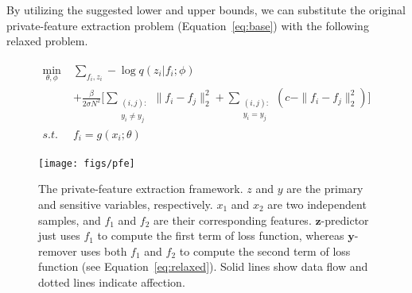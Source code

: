 \documentclass[10pt,journal,compsoc]{IEEEtran}
\newcommand{\alert}[1]{\textcolor{purple}{#1}}
\begin{document}

By utilizing the suggested lower and upper bounds, we can substitute the original private-feature extraction problem (Equation~\ref{eq:base}) with the following relaxed problem.

\begin{align} \label{eq:relaxed}
\begin{split}
\min_{\theta, \phi}\; 
& \sum_{f_i,z_i} -\log q(z_i|f_i;\phi) \\ 
&  + \frac{\beta}{2\sigma N^2} \Big[ \sum_{\substack{(i,j):\\y_i\neq y_j}} \|f_i-f_j\|_2^2  +  \sum_{\substack{(i,j):\\y_i = y_j}} (c - \|f_i-f_j\|_2^2)  \Big]  \\
s.t.\; & f_i = g(x_i;\theta)
\end{split}
\end{align}\begin{figure}[t]
	\centering
	\texttt{[image: figs/pfe]} 
	\caption{The private-feature extraction framework. $z$ and $y$ are the primary and sensitive variables, respectively. $x_1$ and $x_2$ are two independent samples, and $f_1$ and $f_2$ are their corresponding features. $\textbf{z}$-predictor just uses $f_1$ to compute the first term of loss function, whereas $\textbf{y}$-remover uses both $f_1$ and $f_2$ to compute the second term of loss function (see Equation~\ref{eq:relaxed}). Solid lines show data flow and dotted lines indicate affection.}
	\label{fig:framework}
\end{figure}
\end{document}
